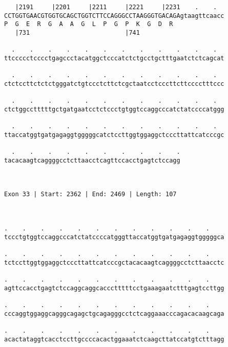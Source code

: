 \documentclass{article}
\begin{document}
\begin{Verbatim}
   |2191     |2201     |2211     |2221     |2231    .    .  
CCTGGTGAACGTGGTGCAGCTGGTCTTCCAGGGCCTAAGGGTGACAGAgtaagttcaacc
P  G  E  R  G  A  A  G  L  P  G  P  K  G  D  R              
   |731                          |741                       
  
  .    .    .    .    .    .    .    .    .    .    .    .  
ttccccctcccctgagccctacatggctcccatctctgcctgctttgaatctctcagcat
                                                            
  .    .    .    .    .    .    .    .    .    .    .    .  
ctctccttctctctgggatctgtccctcttctcgctaatcctcccttcttcccctttccc
                                                            
  .    .    .    .    .    .    .    .    .    .    .    .  
ctctggcctttttgctgatgaatcctctccctgtggtccaggcccatctatccccatggg
                                                            
  .    .    .    .    .    .    .    .    .    .    .    .  
ttaccatggtgatgagaggtgggggcatctccttggtggaggctcccttattcatcccgc
                                                            
  .    .    .    .    .    .    .    .    .    .
tacacaagtcaggggcctcttaacctcagttccacctgagtctccagg
                                                
                                                
 
Exon 33 | Start: 2362 | End: 2469 | Length: 107



.    .    .    .    .    .    .    .    .    .    .    .    
tccctgtggtccaggcccatctatccccatgggttaccatggtgatgagaggtgggggca
                                                            
.    .    .    .    .    .    .    .    .    .    .    .    
tctccttggtggaggctcccttattcatcccgctacacaagtcaggggcctcttaacctc
                                                            
.    .    .    .    .    .    .    .    .    .    .    .    
agttccacctgagtctccaggcaggcaccctttttcctgaaagaatctttgagtccttgg
                                                            
.    .    .    .    .    .    .    .    .    .    .    .    
cccaggtggaggcagggcagagctgcagagggcctctcaggaaacccagacacaagcaga
                                                            
.    .    .    .    .    .    .    .    .    .    .    .    
acactataggtcacctccttgccccacactggaaatctcaagcttatccatgtctttagg
                                                            

\end{Verbatim}
\end{document}
